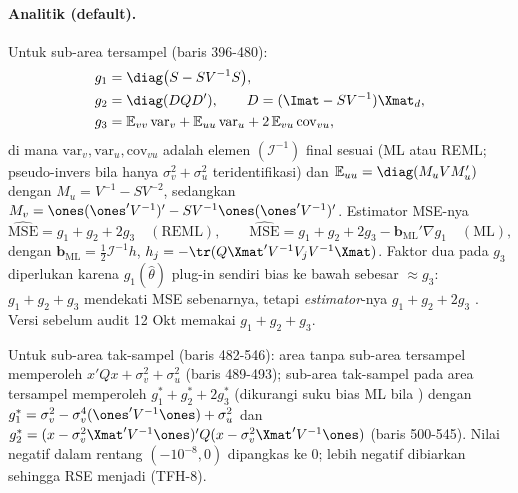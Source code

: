 \paragraph{Analitik (default).} Untuk sub-area tersampel (baris 396-480):
\begin{align}
  g_1&=\diag\bigl(S-SV^{-1}S\bigr),
    \label{eq:tf-g1}\\
  g_2&=\diag(DQD'),\qquad D=(\Imat-SV^{-1})\Xmat_d,
    \label{eq:tf-g2}\\
  g_3&=\mathbb E_{vv}\,\mathrm{var}_v+\mathbb E_{uu}\,\mathrm{var}_u
      +2\,\mathbb E_{vu}\,\mathrm{cov}_{vu},
    \label{eq:tf-g3}
\end{align}
di mana $\mathrm{var}_v,\mathrm{var}_u,\mathrm{cov}_{vu}$ adalah elemen
$(\mathcal I^{-1})$ final sesuai  (ML atau REML; pseudo-invers
bila hanya $\sigma_v^2+\sigma_u^2$ teridentifikasi) dan
$\mathbb E_{uu}=\diag(M_uVM_u')$ dengan $M_u=V^{-1}-SV^{-2}$, sedangkan
$M_v=\ones(\ones'V^{-1})'-SV^{-1}\ones(\ones'V^{-1})'$. Estimator MSE-nya
\begin{equation}
  \widehat{\mathrm{MSE}}=g_1+g_2+2g_3\quad(\text{REML}),\qquad
  \widehat{\mathrm{MSE}}=g_1+g_2+2g_3-\mathbf b_{\text{ML}}'\nabla g_1
  \quad(\text{ML}),
  \label{eq:tf-mse}
\end{equation}
dengan $\mathbf b_{\text{ML}}=\tfrac12\mathcal I^{-1}h$,
$h_j=-\tr(Q\Xmat'V^{-1}V_jV^{-1}\Xmat)$. Faktor dua pada $g_3$ diperlukan
karena $g_1(\hat\theta)$ plug-in sendiri bias ke bawah sebesar $\approx g_3$:
$g_1+g_2+g_3$ mendekati MSE sebenarnya, tetapi \emph{estimator}-nya
$g_1+g_2+2g_3$ \citep{prasad1990estimation, datta2000unified}. Versi
sebelum audit 12 Okt memakai $g_1+g_2+g_3$.


Untuk sub-area tak-sampel (baris 482-546): area tanpa sub-area tersampel
memperoleh $x'Qx+\sigma_v^2+\sigma_u^2$ (baris 489-493); sub-area tak-sampel
pada area tersampel memperoleh $g_1^\ast+g_2^\ast+2g_3^\ast$ (dikurangi suku
bias ML bila ) dengan
$g_1^\ast=\sigma_v^2-\sigma_v^4(\ones'V^{-1}\ones)+\sigma_u^2$ dan
$g_2^\ast=(x-\sigma_v^2\Xmat'V^{-1}\ones)'Q(x-\sigma_v^2\Xmat'V^{-1}\ones)$
(baris 500-545). Nilai negatif dalam rentang $(-10^{-8},0)$ dipangkas ke $0$;
lebih negatif dibiarkan sehingga RSE menjadi  (TFH-8).

